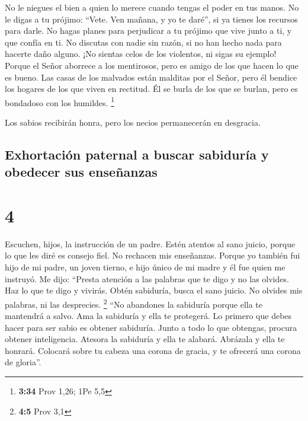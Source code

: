  No le niegues el bien a quien lo merece cuando tengas el
poder en tus manos.  No le digas a tu prójimo: ``Vete.
Ven mañana, y yo te daré'', si ya tienes los recursos para darle.
 No hagas planes para perjudicar a tu prójimo que vive
junto a ti, y que confía en ti.  No discutas con nadie
sin razón, si no han hecho nada para hacerte daño alguno.
 ¡No sientas celos de los violentos, ni sigas su ejemplo!
 Porque el Señor aborrece a los mentirosos, pero es amigo
de los que hacen lo que es bueno.  Las casas de los
malvados están malditas por el Señor, pero él bendice los hogares de los
que viven en rectitud.  Él se burla de los que se burlan,
pero es bondadoso con los humildes. \footnote{\textbf{3:34} Prov 1,26;
  1Pe 5,5}

 Los sabios recibirán honra, pero los necios permanecerán
en desgracia.

\hypertarget{exhortaciuxf3n-paternal-a-buscar-sabiduruxeda-y-obedecer-sus-enseuxf1anzas}{%
\subsection{Exhortación paternal a buscar sabiduría y obedecer sus
enseñanzas}\label{exhortaciuxf3n-paternal-a-buscar-sabiduruxeda-y-obedecer-sus-enseuxf1anzas}}

\hypertarget{section-3}{%
\section{4}\label{section-3}}

 Escuchen, hijos, la instrucción de un padre. Estén
atentos al sano juicio,  porque lo que les diré es consejo
fiel. No rechacen mis enseñanzas.  Porque yo también fui
hijo de mi padre, un joven tierno, e hijo único de mi madre
 y él fue quien me instruyó. Me dijo: ``Presta atención a
las palabras que te digo y no las olvides. Haz lo que te digo y vivirás.
 Obtén sabiduría, busca el sano juicio. No olvides mis
palabras, ni las desprecies. \footnote{\textbf{4:5} Prov 3,1}
 ``No abandones la sabiduría porque ella te mantendrá a
salvo. Ama la sabiduría y ella te protegerá.  Lo primero
que debes hacer para ser sabio es obtener sabiduría. Junto a todo lo que
obtengas, procura obtener inteligencia.  Atesora la
sabiduría y ella te alabará. Abrázala y ella te honrará. 
Colocará sobre tu cabeza una corona de gracia, y te ofrecerá una corona
de gloria''.


